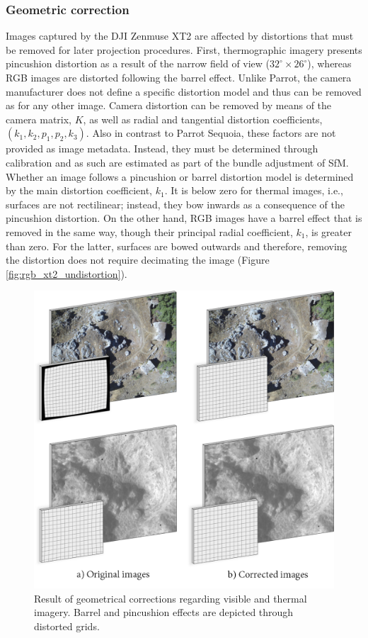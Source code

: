 \subsubsection{Geometric correction}

Images captured by the DJI Zenmuse XT2 are affected by distortions that must be removed for later projection procedures. First, thermographic imagery presents pincushion distortion as a result of the narrow field of view ($32^\circ \times 26^\circ$), whereas RGB images are distorted following the barrel effect. Unlike Parrot, the camera manufacturer does not define a specific distortion model and thus can be removed as for any other image. Camera distortion can be removed by means of the camera matrix, $K$, as well as radial and tangential distortion coefficients, $(k_1, k_2, p_1, p_2, k_3)$. Also in contrast to Parrot Sequoia, these factors are not provided as image metadata. Instead, they must be determined through calibration and as such are estimated as part of the bundle adjustment of SfM. Whether an image follows a pincushion or barrel distortion model is determined by the main distortion coefficient, $k_1$. It is below zero for thermal images, i.e., surfaces are not rectilinear; instead, they bow inwards as a consequence of the pincushion distortion. On the other hand, RGB images have a barrel effect that is removed in the same way, though their principal radial coefficient, $k_1$, is greater than zero. For the latter, surfaces are bowed outwards and therefore, removing the distortion does not require decimating the image (Figure \ref{fig:rgb_xt2_undistortion}).

\begin{figure}
    \includegraphics{figs/materials/thermal_distortion.png}
    \caption{Result of geometrical corrections regarding visible and thermal imagery. Barrel and pincushion effects are depicted through distorted grids.}
    \label{fig:thermal_rgb_distortion}
\end{figure}

